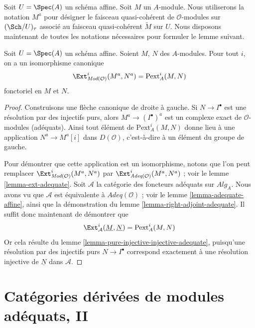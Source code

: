 \noindent
Soit $U = \Spec(A)$ un schéma affine. Soit $M$ un $A$-module.
Nous utiliserons la notation $M^a$ pour désigner le faisceau quasi-cohérent
de $\mathcal{O}$-modules sur $(\Sch/U)_\tau$ associé
au faisceau quasi-cohérent $\widetilde{M}$ sur $U$.
Nous disposons maintenant de toutes les notations nécessaires pour formuler le lemme suivant.

\begin{lemma}
\label{lemma-big-ext}
Soit $U = \Spec(A)$ un schéma affine. Soient $M$, $N$ des $A$-modules.
Pour tout $i$, on a un isomorphisme canonique
$$
\Ext^i_{\textit{Mod}(\mathcal{O})}(M^a, N^a) = \text{Pext}^i_A(M, N)
$$
fonctoriel en $M$ et $N$.
\end{lemma}

\begin{proof}
Construisons une flèche canonique de droite à gauche. Si
$N \to I^\bullet$ est une résolution par des injectifs purs, alors
$M^a \to (I^\bullet)^a$ est un complexe exact de
$\mathcal{O}$-modules (adéquats). Ainsi tout élément de $\text{Pext}^i_A(M, N)$
donne lieu à une application $N^a \to M^a[i]$ dans $D(\mathcal{O})$, c'est-à-dire à
un élément du groupe de gauche.

\medskip\noindent
Pour démontrer que cette application est un isomorphisme, notons que l'on peut remplacer
$\Ext^i_{\textit{Mod}(\mathcal{O})}(M^a, N^a)$ par
$\Ext^i_{\textit{Adeq}(\mathcal{O})}(M^a, N^a)$ ; voir le
lemme \ref{lemma-ext-adequate}.
Soit $\mathcal{A}$ la catégorie des foncteurs adéquats
sur $\textit{Alg}_A$. Nous avons vu que $\mathcal{A}$ est
équivalente à $\textit{Adeq}(\mathcal{O})$ ; voir le
lemme \ref{lemma-adequate-affine}, ainsi que la démonstration du
lemme \ref{lemma-right-adjoint-adequate}.
Il suffit donc maintenant de démontrer que
$$
\Ext^i_\mathcal{A}(\underline{M}, \underline{N}) =
\text{Pext}^i_A(M, N)
$$
Or cela résulte du
lemme \ref{lemma-pure-injective-injective-adequate},
puisqu'une résolution par des injectifs purs $N \to I^\bullet$ correspond exactement
à une résolution injective de $\underline{N}$ dans $\mathcal{A}$.
\end{proof}







\section{Catégories dérivées de modules adéquats, II}
\label{section-derived-categories}

